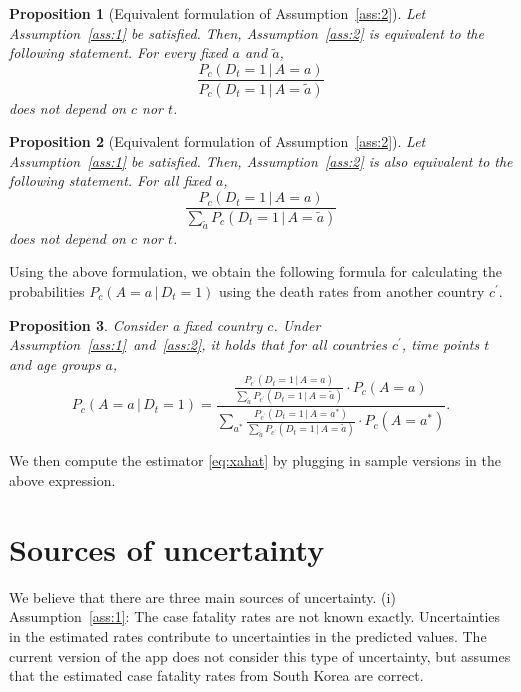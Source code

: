 \documentclass[a4paper]{article}
\newtheorem{prop}{Proposition}
\newcommand{\given}{\, \vert \,}
\newcommand\Niklas[1]{{\color{Fuchsia}Niklas: #1}}
\begin{document}
\begin{prop}[Equivalent formulation of Assumption~\ref{ass:2}] \label{prop:equiv1}
Let Assumption~\ref{ass:1} be satisfied. Then, Assumption~\ref{ass:2} is equivalent to the following statement. 
For every fixed $a$ and $\tilde{a}$, 
\begin{equation*} \label{eq:a2equiv2}
\frac{P_c(D_t = 1\,|\,A = a)}{P_c(D_t = 1\,|\,A = \tilde{a})}
\end{equation*}
does not depend on $c$ nor $t$.
\end{prop}
%
%
\begin{prop}[Equivalent formulation of Assumption~\ref{ass:2}] \label{prop:equiv2}
Let Assumption~\ref{ass:1} be satisfied. Then, Assumption~\ref{ass:2} is also equivalent to the following statement. 
For all fixed $a$,  
\begin{equation} \label{eq:equiv2}
\frac{P_c(D_t = 1 \given A = a)}
{\sum_{\tilde{a}} P_c(D_t = 1 \given A = \tilde{a})}
\end{equation}
%
does not depend on $c$ nor $t$. 
\end{prop}
%
%
Using the above formulation, we obtain the following formula for calculating the probabilities 
$P_c(A=a \given D_t = 1)$ using the death rates from another country $c^\prime$.
%
\begin{prop} \label{prop:estimator}
Consider a fixed country $c$. Under Assumption~\ref{ass:1}~and~\ref{ass:2}, 
it holds that for all countries $c^\prime$, time points $t$ and age groups $a$, 
\begin{equation*}
P_{c}(A = a \given D_t = 1) =
\frac{
  \frac{
    P_{c^\prime}(D_t = 1\given A = a)}
    {\sum_{\tilde{a}} P_{c^\prime}(D_t = 1 \given A = \tilde{a})} \cdot P_{c}(A = a)}
  {\sum_{a^*}  
  \frac{
    P_{c^\prime}(D_t = 1\given A = a^*)}
    {\sum_{\tilde{a}} P_{c^\prime}(D_t = 1 \given A = \tilde{a})} \cdot P_{c}(A = a^*)}.
\end{equation*}
\end{prop}
%
We then compute the estimator \eqref{eq:xahat} by plugging in sample versions in the 
above expression. 



\section{Sources of uncertainty} \label{sec:uncert}
We believe that there are 
three main sources of uncertainty. 
(i) Assumption~\ref{ass:1}:
The case fatality rates are not known exactly. Uncertainties in the 
estimated rates
contribute to uncertainties in the
predicted values.
The current version of the app does not consider
this type of uncertainty, but assumes 
that the estimated case fatality rates from South Korea are correct.
\end{document}
